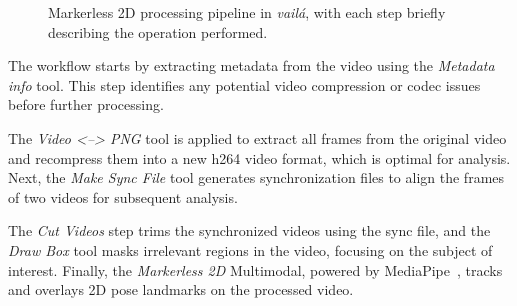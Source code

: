 \documentclass{article}
\begin{document}
\begin{figure}[H]
    \centering
    \caption{Markerless 2D processing pipeline in \textit{vailá}, with each step briefly describing the operation performed.}
    \label{fig:markerless_2D_workflow_horizontal}
\end{figure}

The workflow starts by extracting metadata from the video using the \textit{Metadata info} tool. This step identifies any potential video compression or codec issues before further processing.

The \textit{Video <--> PNG} tool is applied to extract all frames from the original video and recompress them into a new h264 video format, which is optimal for analysis. Next, the \textit{Make Sync File} tool generates synchronization files to align the frames of two videos for subsequent analysis.

The \textit{Cut Videos} step trims the synchronized videos using the sync file, and the \textit{Draw Box} tool masks irrelevant regions in the video, focusing on the subject of interest. Finally, the \textit{Markerless 2D} Multimodal, powered by MediaPipe~\citep{lugaresi2019mediapipe}, tracks and overlays 2D pose landmarks on the processed video.
\end{document}
